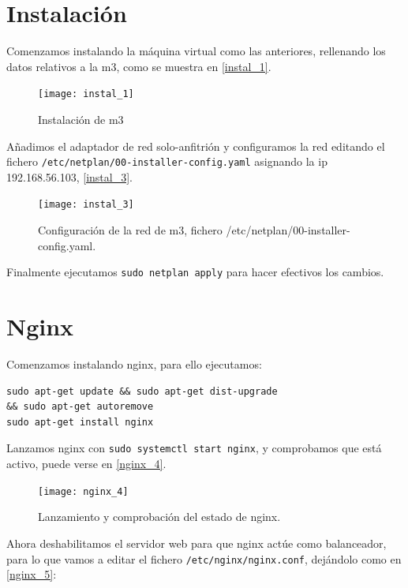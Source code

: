 
\chapter{Instalación}

Comenzamos instalando la máquina virtual como las anteriores, rellenando los datos relativos a la m3, como se muestra en \eqref{instal_1}.

\begin{figure}[h!]
\begin{center}
\caption{Instalación de m3}
\label{instal_1}
\texttt{[image: instal\_1]}
\end{center}
\end{figure}

Añadimos el adaptador de red solo-anfitrión y configuramos la red editando el fichero \verb|/etc/netplan/00-installer-config.yaml| asignando la ip 192.168.56.103, \eqref{instal_3}.

\begin{figure}[h!]
\begin{center}
\caption{Configuración de la red de m3, fichero /etc/netplan/00-installer-config.yaml.}
\label{instal_3}
\texttt{[image: instal\_3]}
\end{center}
\end{figure}

Finalmente ejecutamos \verb|sudo netplan apply| para hacer efectivos los cambios.

\chapter{Nginx}

Comenzamos instalando nginx, para ello ejecutamos:

\begin{verbatim}
sudo apt-get update && sudo apt-get dist-upgrade
&& sudo apt-get autoremove
sudo apt-get install nginx
\end{verbatim}

Lanzamos nginx con \verb|sudo systemctl start nginx|, y comprobamos que está activo, puede verse en \eqref{nginx_4}.

\begin{figure}[h!]
\begin{center}
\caption{Lanzamiento y comprobación del estado de nginx.}
\label{nginx_4}
\texttt{[image: nginx\_4]}
\end{center}
\end{figure}

Ahora deshabilitamos el servidor web para que nginx actúe como balanceador, para lo que vamos a editar el fichero \verb|/etc/nginx/nginx.conf|, dejándolo como en \eqref{nginx_5}:

